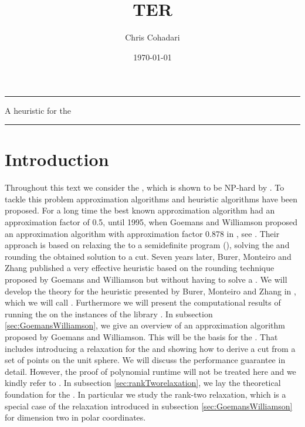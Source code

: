 \documentclass[12pt,a4paper]{article}
\theoremstyle{mythm}
\begin{document}
\title{ \\ TER}
\author{Chris Cohadari}
\date{\today} %
\maketitle
\vspace{-2em}\par\noindent\rule{\textwidth}{0.4pt}
\begin{center}
    {\Large\sc A heuristic for the \mcp}
\end{center}
\par\noindent\rule{\textwidth}{0.4pt}
\tableofcontents
\newpage
\section{Introduction} 
Throughout this text we consider the \mcp, which is shown to be NP-hard by \cite{Garey1974}.
To tackle this problem approximation algorithms and heuristic algorithms have been proposed.
For a long time the best known approximation algorithm had an approximation factor of 0.5, until 1995, when Goemans and Williamson proposed an approximation
algorithm with approximation factor 0.878 in \cite{GoemansWilliamson1995}, see \cite[p. 420]{Korte2018}.
Their approach is based on relaxing the \mcp to a semidefinite program (\SDP), solving the \SDP and rounding the obtained solution to a cut.
Seven years later, Burer, Monteiro and Zhang published a very effective heuristic based on the rounding technique proposed by Goemans and Williamson but without having to
solve a \SDP.
We will develop the theory for the heuristic presented by Burer, Monteiro and Zhang in \cite{Burer2002}, which we will call \BH. 
Furthermore we will present the computational results of running the \BH on the instances of the library \cite{MallachLibrary}.
In subsection \ref{sec:GoemansWilliamson}, we give an overview of an approximation algorithm proposed by Goemans and Williamson. 
This will be the basis for the \BH.
That includes introducing a \sdp relaxation for the \mcp and showing how to derive a cut from a set of points on the unit sphere.
We will discuss the performance guarantee in detail. 
However, the proof of polynomial runtime will not be treated here and we kindly refer to \cite{Korte2018}.
In subsection \ref{sec:rankTworelaxation}, we lay the theoretical foundation for the \BH. %
In particular we study the rank-two relaxation, which is a special case of the \SDP relaxation introduced in subsection \ref{sec:GoemansWilliamson} for dimension two in polar coordinates.
\end{document}
